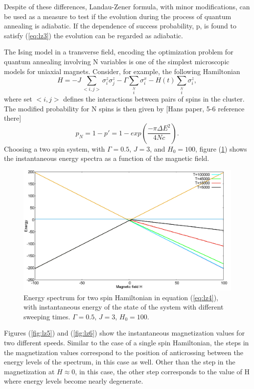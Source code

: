 \documentclass[12]{article}
\begin{document}
Despite of these differences, Landau-Zener formula, with minor modifications, can be used as a measure to test if the evolution during the process of quantum annealing is adiabatic. If the dependence of success probability, p, is found to satisfy (\ref{eq:lz3}) the evolution can be regarded as adiabatic.

The Ising model in a transverse field, encoding the optimization problem for quantum annealing involving N variables is one of the simplest microscopic models for uniaxial magnets. Consider, for example, the following Hamiltonian
\begin{equation}
H=-J \sum \limits_{<i,j>} \sigma_i^z \sigma_j^z - \Gamma \sum \limits_i \limits^N \sigma_i^x -H(t) \sum \limits_i \limits^N\sigma_i^z, \label{eq:lz4}
\end{equation} 
where set $<i,j>$ defines the interactions between pairs of spins in the cluster. The modified probability for N spins is then given by [Hans paper, 5-6 reference there]\\
\begin{equation}
p_N=1-p'=1-exp(\frac{-\pi {\Delta E}^2}{4Nc}). \label{eq:lz5}
\end{equation}
Choosing a two spin system, with $\Gamma=0.5$, $J=3$, and $H_0=100$, figure (\ref{fig:lz4}) shows the instantaneous energy spectra as a function of the magnetic field.
\begin{figure}[H]
\centering 
\includegraphics[scale=0.3]{EnergySpectrum_H100.png}
\caption{Energy spectrum for two spin Hamiltonian in equation (\ref{eq:lz4}), with instantaneous energy of the state of the system with different sweeping times. $\Gamma=0.5$, $J=3$, $H_0=100$.}
\label{fig:lz4}
\end{figure}
Figures (\ref{fig:lz5}) and (\ref{fig:lz6}) show the instantaneous magnetization values for two different speeds. Similar to the case of a single spin Hamiltonian, the steps in the magnetization values correspond to the position of anticrossing between the energy levels of the spectrum, in this case as well. Other than the step in the magnetization at $H \approx 0$, in this case, the other step corresponds to the value of H where energy levels become nearly degenerate.
\end{document}
